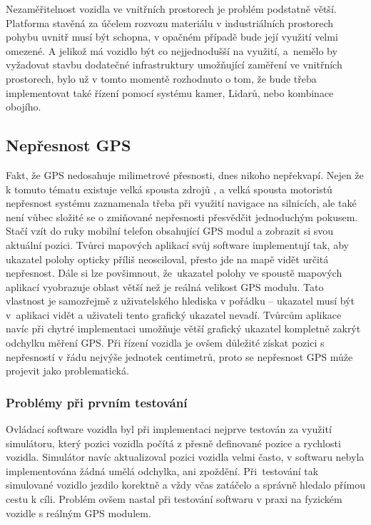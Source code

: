 \documentclass[czech, bachelor]{diploma}
\begin{document}
Nezaměřitelnost vozidla ve vnitřních prostorech je problém podstatně větší. Platforma stavěná za účelem rozvozu materiálu
v industriálních prostorech pohybu uvnitř musí být schopna, v opačném případě bude její využití velmi omezené. A jelikož má
vozidlo být co nejjednodušší na využití, a~nemělo by vyžadovat stavbu dodatečné infrastruktury umožňující zaměření ve vnitřních
prostorech, bylo už v tomto momentě rozhodnuto o tom, že bude třeba implementovat také řízení pomocí systému kamer, Lidarů, nebo
kombinace obojího.

\subsection{Nepřesnost GPS} \label{gps-inaccuracy}

Fakt, že GPS nedosahuje milimetrové přesnosti, dnes nikoho nepřekvapí. Nejen že k tomuto tématu existuje velká spousta zdrojů
\cite{gps-inaccuracy-source}, a velká spousta motoristů nepřesnost systému zaznamenala třeba při využití navigace na silnicích,
ale také není vůbec složité se o zmiňované nepřesnosti přesvědčit jednoduchým pokusem. Stačí vzít do ruky mobilní telefon
obsahující GPS modul a zobrazit si svou aktuální pozici. Tvůrci mapových aplikací svůj software implementují tak, aby ukazatel
polohy opticky příliš neosciloval, přesto jde na mapě vidět určitá nepřesnost. Dále si lze povšimnout, že~ukazatel polohy
ve spoustě mapových aplikací vyobrazuje oblast větší než je reálná velikost GPS modulu. Tato vlastnost je samozřejmě
z uživatelského hlediska v pořádku -- ukazatel musí být v~aplikaci vidět a uživateli tento grafický ukazatel nevadí. Tvůrcům
aplikace navíc při chytré implementaci umožňuje větší grafický ukazatel kompletně zakrýt odchylku měření GPS. Při řízení vozidla
je ovšem důležité získat pozici s nepřesností v řádu nejvýše jednotek centimetrů, proto se nepřesnost GPS může projevit jako
problematická.

\subsubsection{Problémy při prvním testování}

Ovládací software vozidla byl při implementaci nejprve testován za využití simulátoru, který pozici vozidla počítá z přesně
definované pozice a rychlosti vozidla. Simulátor navíc aktualizoval pozici vozidla velmi často, v softwaru nebyla implementována
žádná umělá odchylka, ani zpoždění. Při~testování tak simulované vozidlo jezdilo korektně a vždy včas zatáčelo a správně hledalo
přímou cestu k cíli. Problém ovšem nastal při testování softwaru v praxi na fyzickém vozidle s reálným GPS modulem.
\end{document}
